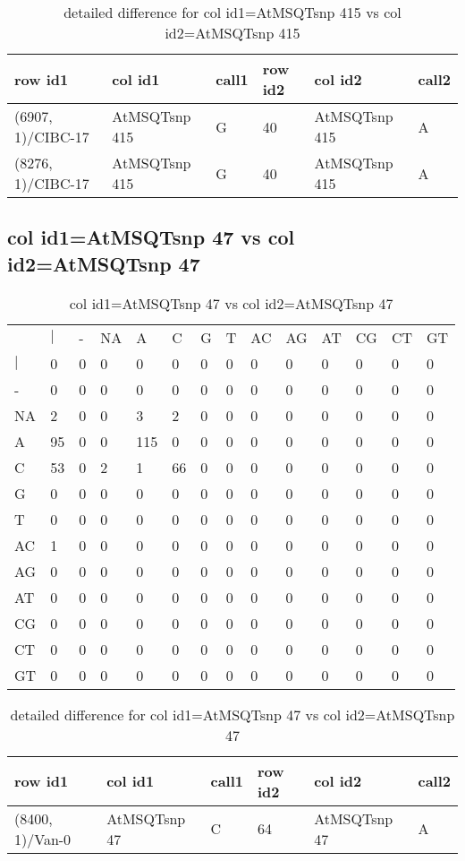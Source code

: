 \begin{center}
\begin{longtable}{|l|l|l|l|l|l|}
\caption{detailed difference for col id1=AtMSQTsnp 415 vs col id2=AtMSQTsnp 415} \label{table_dm929}\\
\hline
row id1&col id1&call1&row id2&col id2&call2\\
\hline
(6907, 1)/CIBC-17&AtMSQTsnp 415&G&40&AtMSQTsnp 415&A\\
(8276, 1)/CIBC-17&AtMSQTsnp 415&G&40&AtMSQTsnp 415&A\\
\hline
\end{longtable}
\end{center}

\subsection{col id1=AtMSQTsnp 47 vs col id2=AtMSQTsnp 47}
\begin{center}
\begin{longtable}{|l|l|l|l|l|l|l|l|l|l|l|l|l|l|}
\caption{col id1=AtMSQTsnp 47 vs col id2=AtMSQTsnp 47} \label{table_dm930}\\
\hline
\\
\hline
&$|$&-&NA&A&C&G&T&AC&AG&AT&CG&CT&GT\\
$|$&0&0&0&0&0&0&0&0&0&0&0&0&0\\
-&0&0&0&0&0&0&0&0&0&0&0&0&0\\
NA&2&0&0&3&2&0&0&0&0&0&0&0&0\\
A&95&0&0&115&0&0&0&0&0&0&0&0&0\\
C&53&0&2&1&66&0&0&0&0&0&0&0&0\\
G&0&0&0&0&0&0&0&0&0&0&0&0&0\\
T&0&0&0&0&0&0&0&0&0&0&0&0&0\\
AC&1&0&0&0&0&0&0&0&0&0&0&0&0\\
AG&0&0&0&0&0&0&0&0&0&0&0&0&0\\
AT&0&0&0&0&0&0&0&0&0&0&0&0&0\\
CG&0&0&0&0&0&0&0&0&0&0&0&0&0\\
CT&0&0&0&0&0&0&0&0&0&0&0&0&0\\
GT&0&0&0&0&0&0&0&0&0&0&0&0&0\\
\hline
\end{longtable}
\end{center}

\begin{center}
\begin{longtable}{|l|l|l|l|l|l|}
\caption{detailed difference for col id1=AtMSQTsnp 47 vs col id2=AtMSQTsnp 47} \label{table_dm931}\\
\hline
row id1&col id1&call1&row id2&col id2&call2\\
\hline
(8400, 1)/Van-0&AtMSQTsnp 47&C&64&AtMSQTsnp 47&A\\
\hline
\end{longtable}
\end{center}

